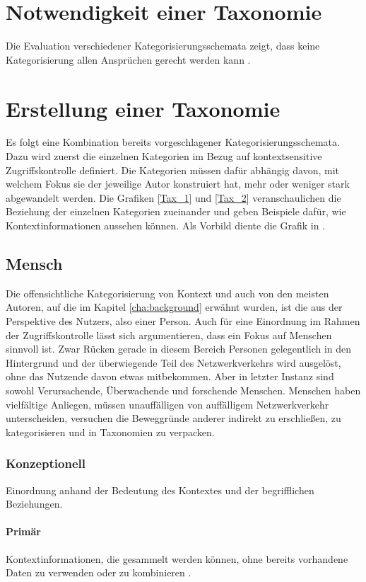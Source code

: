 \section{Notwendigkeit einer Taxonomie}
Die Evaluation verschiedener Kategorisierungsschemata zeigt, dass keine Kategorisierung allen Ansprüchen gerecht werden kann \cite{perera_context_2014}.
\section{ Erstellung einer Taxonomie }
Es folgt eine Kombination bereits vorgeschlagener Kategorisierungsschemata. Dazu wird  zuerst die einzelnen Kategorien im Bezug auf kontextsensitive Zugriffskontrolle definiert. Die Kategorien müssen dafür abhängig davon, mit welchem Fokus sie der jeweilige Autor konstruiert hat, mehr oder weniger stark abgewandelt werden.
Die Grafiken \ref{Tax_1} und \ref{Tax_2} veranschaulichen die Beziehung der einzelnen Kategorien zueinander und geben Beispiele dafür, wie Kontextinformationen aussehen können. Als Vorbild diente die Grafik in \cite{perera_context_2014}. 
\subsection{Mensch}
Die offensichtliche Kategorisierung von Kontext und auch von den meisten Autoren, auf die im Kapitel \ref{cha:background} erwähnt wurden, ist die aus der Perspektive des Nutzers, also einer Person. Auch für eine Einordnung im Rahmen der Zugriffskontrolle lässt sich argumentieren, dass ein Fokus auf Menschen sinnvoll ist. Zwar Rücken gerade in diesem Bereich Personen gelegentlich in den Hintergrund und der überwiegende Teil des Netzwerkverkehrs wird ausgelöst, ohne das Nutzende davon etwas mitbekommen. Aber in letzter Instanz sind sowohl Verursachende, Überwachende und forschende Menschen. Menschen haben vielfältige Anliegen, müssen unauffälligen von auffälligem Netzwerkverkehr unterscheiden, versuchen die Beweggründe anderer indirekt zu erschließen, zu kategorisieren und in Taxonomien zu verpacken.

\subsubsection{Konzeptionell}
Einordnung anhand der Bedeutung des Kontextes und der begrifflichen Beziehungen.
\paragraph{Primär}
Kontextinformationen, die gesammelt werden können, ohne bereits vorhandene Daten zu verwenden oder zu kombinieren \cite{abowd_towards_1999}. 
